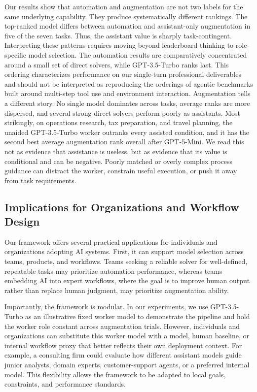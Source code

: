 
Our results show that automation and augmentation are not two labels for the same underlying capability. They produce systematically different rankings. The top-ranked model differs between automation and assistant-only augmentation in five of the seven tasks. Thus, the assistant value is sharply task-contingent. Interpreting these patterns requires moving beyond leaderboard thinking to role-specific model selection. The automation results are comparatively concentrated around a small set of
direct solvers, while GPT-3.5-Turbo ranks last. This ordering characterizes performance on our single-turn professional deliverables and should not be interpreted as reproducing the orderings of agentic benchmarks built
around multi-step tool use and environment interaction.
Augmentation tells a different story. No single model dominates across tasks, average ranks are more dispersed, and several strong direct solvers perform poorly as assistants. Most strikingly, on operations research, tax preparation, and travel planning, the unaided GPT-3.5-Turbo worker outranks every assisted condition, and it has the second best average augmentation rank overall after GPT-5-Mini. We read this not as evidence that assistance is useless, but as evidence that its value is conditional and can be negative. Poorly matched or overly complex process guidance can distract the worker, constrain useful execution, or push it away from task requirements.

\subsection{Implications for Organizations and Workflow Design}

Our framework offers several practical applications for individuals and organizations adopting AI systems. First, it can support model selection across teams, products, and workflows. Teams seeking a reliable solver for well-defined, repeatable tasks may prioritize automation performance, whereas teams embedding AI into expert workflows, where the goal is to improve human output rather than replace human judgment, may prioritize augmentation ability.

Importantly, the framework is modular. In our experiments, we use GPT-3.5-Turbo as an illustrative fixed worker model to demonstrate the pipeline and hold the worker role constant across augmentation trials. However, individuals and organizations can substitute this worker model with a model, human baseline, or internal workflow proxy that better reflects their own deployment context. For example, a consulting firm could evaluate how different assistant models guide junior analysts, domain experts, customer-support agents, or a preferred internal model. This flexibility allows the framework to be adapted to local goals, constraints, and performance standards.
    
